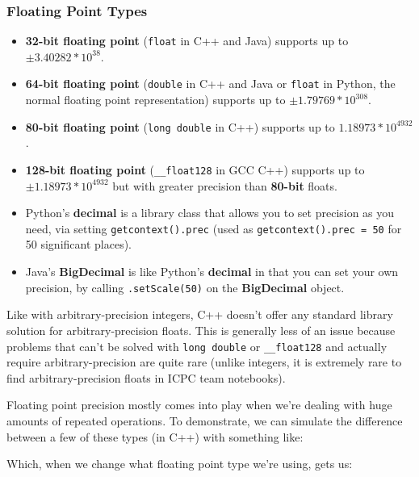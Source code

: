 \subsubsection{Floating Point Types}

  

\begin{itemize}
\item \textbf{32-bit floating point} (\texttt{float} in C++ and Java) supports up to $\pm3.40282 * 10^{38}$.
\item \textbf{64-bit floating point} (\texttt{double} in C++ and Java or \texttt{float} in Python, the normal floating point representation) supports up to $\pm1.79769 * 10^{308}$.
\item \textbf{80-bit floating point} (\texttt{long double} in C++) supports up to $1.18973 * 10^{4932}$.
\item \textbf{128-bit floating point} (\texttt{__float128} in GCC C++) supports up to $\pm1.18973 * 10^{4932}$ but with greater precision than \textbf{80-bit} floats.
\item Python's \textbf{decimal} is a library class that allows you to set precision as you need, via setting \texttt{getcontext().prec} (used as \texttt{getcontext().prec = 50} for 50 significant places).
\item Java's \textbf{BigDecimal} is like Python's \textbf{decimal} in that you can set your own precision, by calling \texttt{.setScale(50)} on the \textbf{BigDecimal} object.
\end{itemize}

Like with arbitrary-precision integers, C++ doesn't offer any standard library solution for arbitrary-precision floats. This is generally less of an issue because problems that can't be solved with \texttt{long double} or \texttt{__float128} and actually require arbitrary-precision are quite rare (unlike integers, it is extremely rare to find arbitrary-precision floats in ICPC team notebooks).

Floating point precision mostly comes into play when we're dealing with huge amounts of repeated operations. To demonstrate, we can simulate the difference between a few of these types (in C++) with something like:


Which, when we change what floating point type we're using, gets us:


